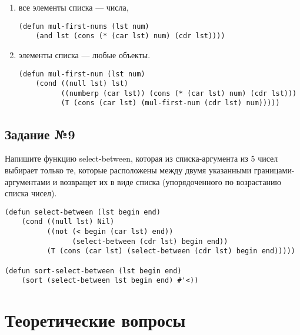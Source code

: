 \begin{enumerate}
    \item все элементы списка --- числа,

\vspace{4mm}
\begin{minipage}{0.92\linewidth}
\begin{lstlisting}
(defun mul-first-nums (lst num)
    (and lst (cons (* (car lst) num) (cdr lst))))
\end{lstlisting}
\end{minipage}

    \item элементы списка --- любые объекты.

\vspace{4mm}
\begin{minipage}{0.92\linewidth}
\begin{lstlisting}
(defun mul-first-num (lst num)
    (cond ((null lst) lst)
          ((numberp (car lst)) (cons (* (car lst) num) (cdr lst)))
          (T (cons (car lst) (mul-first-num (cdr lst) num)))))
\end{lstlisting}
\end{minipage}

\end{enumerate}

\section{Задание №9}

Напишите функцию select-between, которая из списка-аргумента из 5 чисел
выбирает только те, которые расположены между двумя указанными
границами-аргументами и возвращет их в виде списка (упорядоченного по
возрастанию списка чисел).

\vspace{4mm}
\begin{minipage}{0.92\linewidth}
\begin{lstlisting}
(defun select-between (lst begin end)
    (cond ((null lst) Nil)
          ((not (< begin (car lst) end))
                (select-between (cdr lst) begin end))
          (T (cons (car lst) (select-between (cdr lst) begin end)))))

(defun sort-select-between (lst begin end)
    (sort (select-between lst begin end) #'<))
\end{lstlisting}
\end{minipage}

\chapter{Теоретические вопросы}

